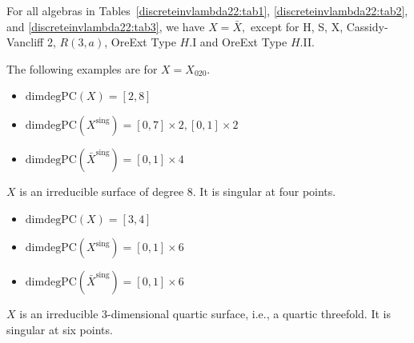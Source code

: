 \documentclass{amsart}
\begin{document}
\begin{remark}
For all algebras in Tables~\ref{discreteinvlambda22:tab1}, \ref{discreteinvlambda22:tab2}, and \ref{discreteinvlambda22:tab3}, we have 
 $X = \bar{X},$ except for H, S, X, Cassidy-Vancliff 2, $R(3,a)$, OreExt Type $H.$I and OreExt Type $H.$II.
\end{remark}

\clearpage

\pagebreak

The following examples are for \(X = X_{020}\).




\begin{example}[Algebra C]\leavevmode
\begin{itemize}
    \item \(\mathrm{dimdegPC}(X) = [2,8]\)
    \item \(\mathrm{dimdegPC}(X^{\mathrm{sing}}) = [0,7]\times 2, [0,1]\times 2\)
    \item \(\mathrm{dimdegPC}(\bar{X}^{\mathrm{sing}}) = [0,1]\times 4\)
\end{itemize}

\(X\) is an irreducible surface of degree 8. It is singular at four points.
\end{example}

\begin{example}[Algebra M]\leavevmode
\begin{itemize}
    \item \(\mathrm{dimdegPC}(X) = [3,4]\)
    \item \(\mathrm{dimdegPC}(X^{\mathrm{sing}}) = [0,1]\times 6\)
    \item \(\mathrm{dimdegPC}(\bar{X}^{\mathrm{sing}}) = [0,1]\times 6\)
\end{itemize}

\(X\) is an irreducible 3-dimensional quartic surface, i.e., a quartic threefold. It is singular at six points.
\end{example}
\end{document}
